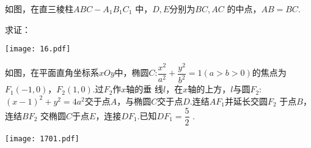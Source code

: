 \documentclass[no-math,twoside]{exam}  %
\renewcommand\parallel{%
	\mathrel{\text{\tikz[baseline]
			\draw (0em,-0.3ex) -- (.4em,1.7ex)
			(.2em,-0.3ex) -- (.6em,1.7ex);%
}}}
\renewcommand{\solutiontitle}{{\bfseries 答案：}}
\begin{document}
\begin{questions}
\renewcommand{\solutiontitle}{{\bfseries 证明: }}
{

\begin{minipage}[t]{0.65\textwidth}
\linespread{1.4}\selectfont		
		{\CTEXindent
	如图，在直三棱柱$ ABC -A_1 B_1 C_1$ 中，$D,E $分别为$ BC,AC$ 的中点，$AB=BC$.
	
	求证：}
	
\end{minipage} \quad
\begin{minipage}[t]{0.35\textwidth}
\vspace{-8pt}
	{\texttt{[image: 16.pdf]}}%
\end{minipage}

\vfill


\newpage
\renewcommand{\solutiontitle}{{\bfseries 解: }}
{

\begin{minipage}[t]{0.65\textwidth}
\linespread{1.4}\selectfont		
	{\CTEXindent
	如图，在平面直角坐标系$xOy$中，椭圆$C$:$\dfrac { x ^ { 2 } } { a ^ { 2 } } + \dfrac { y ^ { 2 } } { b ^ { 2 } } = 1 ( a > b > 0 )$的焦点为$F _ { 1 } ( - 1,0 )$，$F _ { 2 } ( 1,0 )$.过$F_2$作$x$轴的垂 线$l$，在$x$轴的上方，$l$与圆$F _2$:$( x - 1 ) ^ { 2 } + y ^ { 2 } = 4 a ^ { 2 }$交于点$A$，与椭圆$C$交于点$D$.连结$AF_1$并延长交圆$F_2$ 于点$B$，连结$BF_2$ 交椭圆$C$于点$E$，连接$DF _1$.已知$ DF_1=\dfrac{ 5}{2}$ .
	}
	{}%
\end{minipage} \quad
\begin{minipage}[t]{0.35\textwidth}
\vspace{-8pt}
	{\texttt{[image: 1701.pdf]}}%
\end{minipage}


}}
\end{questions}
\end{document}
